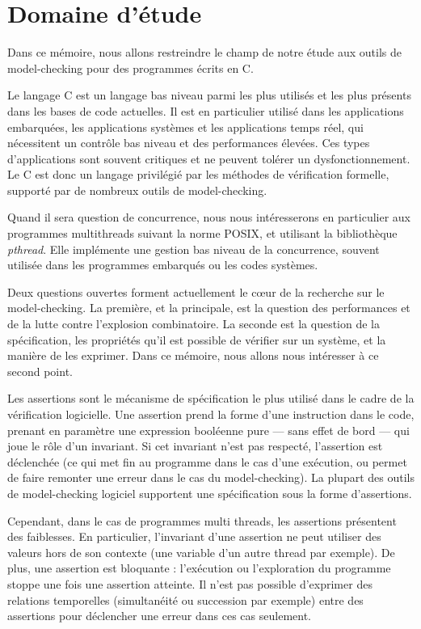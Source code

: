 \section{Domaine d'étude}

Dans ce mémoire, nous allons restreindre le champ de notre étude aux
outils de model-checking pour des programmes écrits en C.

Le langage C est un langage bas niveau parmi les plus utilisés et les
plus présents dans les bases de code actuelles. Il est en particulier
utilisé dans les applications embarquées, les applications systèmes et
les applications temps réel, qui nécessitent un contrôle bas niveau et
des performances élevées. Ces types d'applications sont souvent
critiques et ne peuvent tolérer un dysfonctionnement. Le C est donc un
langage privilégié par les méthodes de vérification formelle, supporté
par de nombreux outils de model-checking.

Quand il sera question de concurrence, nous nous intéresserons en
particulier aux programmes multithreads suivant la norme POSIX, et
utilisant la bibliothèque \emph{pthread}. Elle implémente une gestion
bas niveau de la concurrence, souvent utilisée dans les programmes
embarqués ou les codes systèmes.

Deux questions ouvertes forment actuellement le cœur de la recherche
sur le model-checking. La première, et la principale, est la question
des performances et de la lutte contre l'explosion combinatoire. La
seconde est la question de la spécification, les propriétés qu'il est
possible de vérifier sur un système, et la manière de les exprimer. Dans
ce mémoire, nous allons nous intéresser à ce second point.

Les assertions sont le mécanisme de spécification le plus utilisé dans
le cadre de la vérification logicielle. Une assertion prend la forme
d'une instruction dans le code, prenant en paramètre une expression
booléenne pure --- sans effet de bord --- qui joue le rôle d'un
invariant. Si cet invariant n'est pas respecté, l'assertion est
déclenchée (ce qui met fin au programme dans le cas d'une exécution, ou
permet de faire remonter une erreur dans le cas du model-checking). La
plupart des outils de model-checking logiciel supportent une
spécification sous la forme d'assertions.

Cependant, dans le cas de programmes multi threads, les assertions
présentent des faiblesses. En particulier, l'invariant d'une assertion
ne peut utiliser des valeurs hors de son contexte (une variable d'un
autre thread par exemple). De plus, une assertion est bloquante :
l'exécution ou l'exploration du programme stoppe une fois une assertion
atteinte. Il n'est pas possible d'exprimer des relations temporelles
(simultanéité ou succession par exemple) entre des assertions pour
déclencher une erreur dans ces cas seulement.

